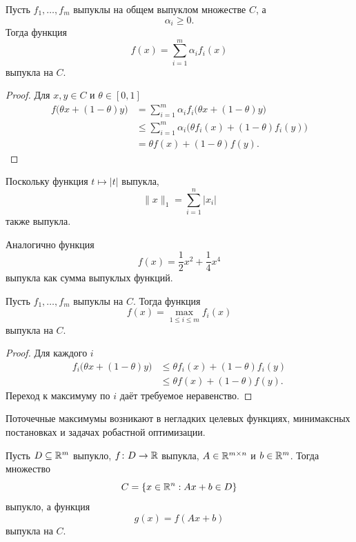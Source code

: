 \begin{theorem}
Пусть \(f_1,\ldots,f_m\) выпуклы на общем выпуклом множестве \(C\), а
\[
    \alpha_i\ge0.
\]
Тогда функция
\[
    f(x)=\sum_{i=1}^{m}\alpha_i f_i(x)
\]
выпукла на \(C\).
\end{theorem}

\begin{proof}
Для \(x,y\in C\) и \(\theta\in[0,1]\)
\[
\begin{aligned}
    f\bigl(\theta x+(1-\theta)y\bigr)
    &=
    \sum_{i=1}^{m}
    \alpha_i
    f_i\bigl(\theta x+(1-\theta)y\bigr)
    \\
    &\le
    \sum_{i=1}^{m}
    \alpha_i
    \bigl(
        \theta f_i(x)+(1-\theta)f_i(y)
    \bigr)
    \\
    &=
    \theta f(x)+(1-\theta)f(y).
\end{aligned}
\]
\end{proof}

Поскольку функция \(t\mapsto\lvert t\rvert\) выпукла,
\[
    \lVert x\rVert_1
    =
    \sum_{i=1}^{n}\lvert x_i\rvert
\]
также выпукла.

Аналогично функция
\[
    f(x)
    =
    \frac12x^2+\frac14x^4
\]
выпукла как сумма выпуклых функций.



\begin{theorem}
Пусть \(f_1,\ldots,f_m\) выпуклы на \(C\). Тогда функция
\[
    f(x)=\max_{1\le i\le m}f_i(x)
\]
выпукла на \(C\).
\end{theorem}

\begin{proof}
Для каждого \(i\)
\[
\begin{aligned}
    f_i\bigl(\theta x+(1-\theta)y\bigr)
    &\le
    \theta f_i(x)+(1-\theta)f_i(y)
    \\
    &\le
    \theta f(x)+(1-\theta)f(y).
\end{aligned}
\]
Переход к максимуму по \(i\) даёт требуемое неравенство.
\end{proof}

Поточечные максимумы возникают в негладких целевых функциях,
минимаксных постановках и задачах робастной оптимизации.



\begin{theorem}
Пусть \(D\subseteq\mathbb{R}^m\) выпукло, \(f\colon D\to\mathbb{R}\) выпукла,
\(A\in\mathbb{R}^{m\times n}\) и \(b\in\mathbb{R}^m\). Тогда множество
\[
    C=\{x\in\mathbb{R}^n:Ax+b\in D\}
\]
выпукло, а функция
\[
    g(x)=f(Ax+b)
\]
выпукла на \(C\).
\end{theorem}

